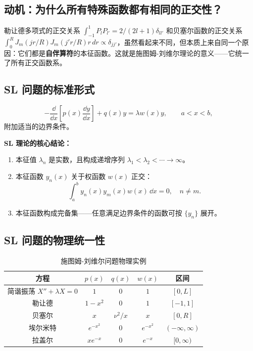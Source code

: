 \subsection*{动机：为什么所有特殊函数都有相同的正交性？}

勒让德多项式的正交关系 $\int_{-1}^1 P_l P_{l'} = 2/(2l+1)\delta_{ll'}$ 和贝塞尔函数的正交关系 $\int_0^R J_m(jr/R)J_m(j'r/R) r\,dr \propto \delta_{jj'}$，虽然看起来不同，但本质上来自同一个原因：它们都是\textbf{自伴算符}的本征函数。这就是施图姆-刘维尔理论的意义——它统一了所有正交函数系。

\subsection{SL 问题的标准形式}

\begin{equation}
-\frac{\dd}{\dd x}\left[p(x)\frac{\dd y}{\dd x}\right] + q(x)y
= \lambda w(x)y,\qquad a<x<b,
\label{eq:sl_form}
\end{equation}
附加适当的边界条件。

\textbf{SL 理论的核心结论：}
\begin{enumerate}
\item 本征值 $\lambda_n$ 是实数，且构成递增序列 $\lambda_1<\lambda_2<\cdots\to\infty$。
\item 本征函数 $y_n(x)$ 关于权函数 $w(x)$ 正交：
\begin{equation}
\int_a^b y_n(x) y_m(x) w(x)\,\dd x = 0,\quad n\neq m.
\end{equation}
\item 本征函数构成完备集——任意满足边界条件的函数可按 $\{y_n\}$ 展开。
\end{enumerate}

\subsection{SL 问题的物理统一性}

\begin{table}[h]
\centering
\caption{施图姆-刘维尔问题物理实例}
\label{tab:sl_examples}
\begin{tabular}{c|c|c|c|c}
\toprule
方程 & $p(x)$ & $q(x)$ & $w(x)$ & 区间 \\
\midrule
简谐振荡 $X''+\lambda X=0$ & $1$ & $0$ & $1$ & $[0,L]$ \\
勒让德 & $1-x^2$ & $0$ & $1$ & $[-1,1]$ \\
贝塞尔 & $x$ & $\nu^2/x$ & $x$ & $[0,R]$ \\
埃尔米特 & $e^{-x^2}$ & $0$ & $e^{-x^2}$ & $(-\infty,\infty)$ \\
拉盖尔 & $xe^{-x}$ & $0$ & $e^{-x}$ & $[0,\infty)$ \\
\bottomrule
\end{tabular}
\end{table}

